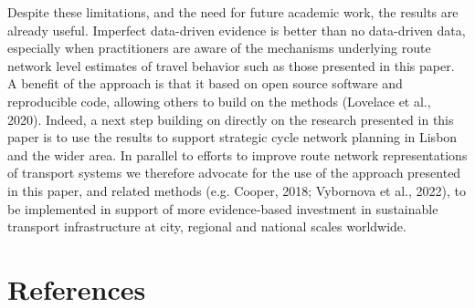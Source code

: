 \documentclass{isprs} %
\begin{document}
Despite these limitations, and the need for future academic work, the results are already useful.
Imperfect data-driven evidence is better than no data-driven data, especially when practitioners are aware of the mechanisms underlying route network level estimates of travel behavior such as those presented in this paper.
A benefit of the approach is that it based on open source software and reproducible code, allowing others to build on the methods (Lovelace et al., 2020).
Indeed, a next step building on directly on the research presented in this paper is to use the results to support strategic cycle network planning in Lisbon and the wider area.
In parallel to efforts to improve route network representations of transport systems we therefore advocate for the use of the approach presented in this paper, and related methods (e.g. Cooper, 2018; Vybornova et al., 2022), to be implemented in support of more evidence-based investment in sustainable transport infrastructure at city, regional and national scales worldwide.

\hypertarget{references}{%
\section*{References}\label{references}}
\end{document}
